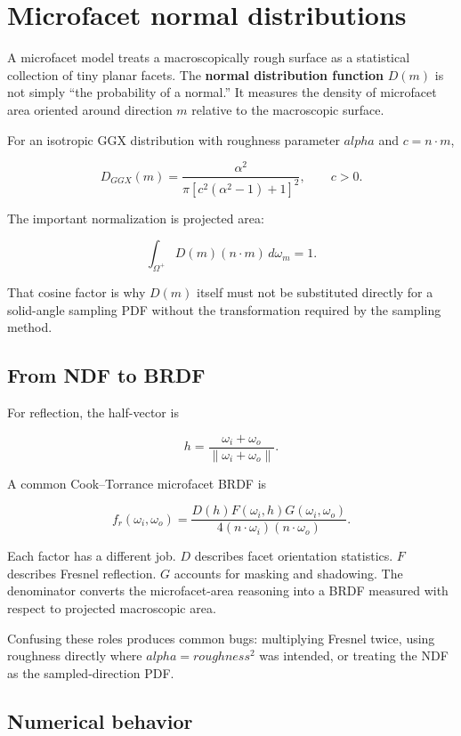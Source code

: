 \hypertarget{appendix-885c1cb64ae9}{}
\section{Microfacet normal distributions}\label{appendix-885c1cb64ae9-microfacet-normal-distributions}

A microfacet model treats a macroscopically rough surface as a statistical collection of tiny planar facets. The \textbf{normal distribution function} \(D(m)\) is not simply ``the probability of a normal.'' It measures the density of microfacet area oriented around direction \(m\) relative to the macroscopic surface.

For an isotropic GGX distribution with roughness parameter \(alpha\) and \(c = n\cdot m\),

\[
D_{GGX}(m)=
\frac{\alpha^2}
{\pi\left[c^2(\alpha^2-1)+1\right]^2},
\qquad c>0.
\]

The important normalization is projected area:

\[
\int_{\Omega^+} D(m)(n\cdot m)\,d\omega_m = 1.
\]

That cosine factor is why \(D(m)\) itself must not be substituted directly for a solid-angle sampling PDF without the transformation required by the sampling method.

\subsection{From NDF to BRDF}\label{appendix-885c1cb64ae9-from-ndf-to-brdf}

For reflection, the half-vector is

\[
h=\frac{\omega_i+\omega_o}{\|\omega_i+\omega_o\|}.
\]

A common Cook--Torrance microfacet BRDF is

\[
f_r(\omega_i,\omega_o)=
\frac{D(h)F(\omega_i,h)G(\omega_i,\omega_o)}
{4(n\cdot\omega_i)(n\cdot\omega_o)}.
\]

Each factor has a different job. \(D\) describes facet orientation statistics. \(F\) describes Fresnel reflection. \(G\) accounts for masking and shadowing. The denominator converts the microfacet-area reasoning into a BRDF measured with respect to projected macroscopic area.

Confusing these roles produces common bugs: multiplying Fresnel twice, using roughness directly where \(alpha=roughness^2\) was intended, or treating the NDF as the sampled-direction PDF.

\subsection{Numerical behavior}\label{appendix-885c1cb64ae9-numerical-behavior}

